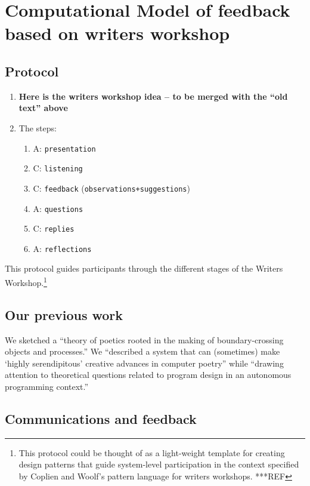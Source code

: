 \section{Computational Model of feedback based on writers workshop}\label{sec:ww-model}

\subsection{Protocol}

\begin{enumerate}
\item \textbf{Here is the writers workshop idea -- to be merged with the ``old text'' above}
\item[] The steps:
\begin{enumerate}
\item A: {\tt presentation}
\item C: {\tt listening}
\item C: {\tt feedback} ({\tt observations}{\tt+}{\tt suggestions})
\item A: {\tt questions}
\item C: {\tt replies}
\item A: {\tt reflections}
\end{enumerate}
\end{enumerate}

This protocol guides participants through the different stages of the Writers Workshop.\footnote{This protocol could be thought of as a light-weight template for
creating design patterns that guide system-level participation in the
context specified by Coplien and Woolf's pattern language for writers
workshops.  ***REF }

\subsection{Our previous work}

We sketched a ``theory of poetics rooted in the making of
boundary-crossing objects and processes.'' We ``described a system
that can (sometimes) make `highly serendipitous' creative advances in
computer poetry'' while ``drawing attention to theoretical questions
related to program design in an autonomous programming context.''

\subsection{Communications and feedback}

